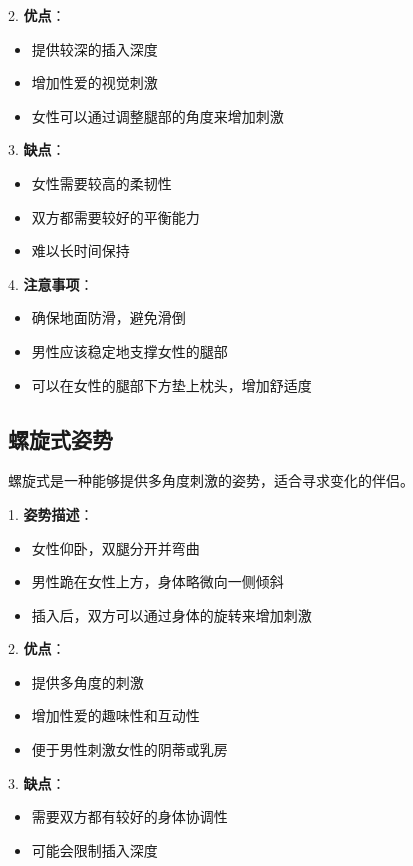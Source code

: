 \documentclass[12pt,UTF8]{ctexbook}
\begin{document}
2. \textbf{优点}：
  \begin{itemize}
  \item 提供较深的插入深度
  \item 增加性爱的视觉刺激
  \item 女性可以通过调整腿部的角度来增加刺激
  \end{itemize}

3. \textbf{缺点}：
  \begin{itemize}
  \item 女性需要较高的柔韧性
  \item 双方都需要较好的平衡能力
  \item 难以长时间保持
  \end{itemize}

4. \textbf{注意事项}：
  \begin{itemize}
  \item 确保地面防滑，避免滑倒
  \item 男性应该稳定地支撑女性的腿部
  \item 可以在女性的腿部下方垫上枕头，增加舒适度
  \end{itemize}

\subsection{螺旋式姿势}

螺旋式是一种能够提供多角度刺激的姿势，适合寻求变化的伴侣。

1. \textbf{姿势描述}：
  \begin{itemize}
  \item 女性仰卧，双腿分开并弯曲
  \item 男性跪在女性上方，身体略微向一侧倾斜
  \item 插入后，双方可以通过身体的旋转来增加刺激
  \end{itemize}

2. \textbf{优点}：
  \begin{itemize}
  \item 提供多角度的刺激
  \item 增加性爱的趣味性和互动性
  \item 便于男性刺激女性的阴蒂或乳房
  \end{itemize}

3. \textbf{缺点}：
  \begin{itemize}
  \item 需要双方都有较好的身体协调性
  \item 可能会限制插入深度
  \end{itemize}
\end{document}
